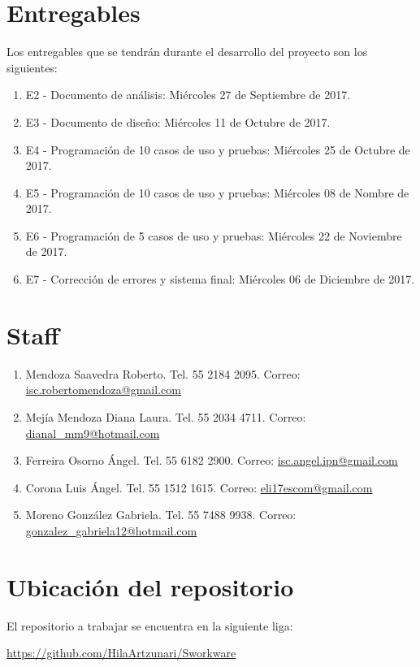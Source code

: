 \section{Entregables}

Los entregables que se tendrán durante el desarrollo del proyecto son los siguientes:

\begin{enumerate}
	\item E2 - Documento de análisis: Miércoles 27 de Septiembre de 2017.
	\item E3 - Documento de diseño: Miércoles 11 de Octubre de 2017.
	\item E4 - Programación de 10 casos de uso y pruebas: Miércoles 25 de Octubre de 2017.
	\item E5 - Programación de 10 casos de uso y pruebas: Miércoles 08 de Nombre de 2017.
	\item E6 - Programación de 5 casos de uso y pruebas: Miércoles 22 de Noviembre de 2017.
	\item E7 - Corrección de errores y sistema final: Miércoles 06 de Diciembre de 2017.
\end{enumerate}

\section{Staff}

\begin{enumerate}
	\item Mendoza Saavedra Roberto. Tel. 55 2184 2095. Correo: \href{isc.robertomendoza@gmail.com}{isc.robertomendoza@gmail.com}
	\item Mejía Mendoza Diana Laura. Tel. 55 2034 4711. Correo: \href{dianal_mm9@hotmail.com}{dianal\_mm9@hotmail.com}
	\item Ferreira Osorno Ángel. Tel. 55 6182 2900. Correo: \href{isc.angel.ipn@gmail.com}{isc.angel.ipn@gmail.com}
	\item Corona Luis Ángel. Tel. 55 1512 1615. Correo: \href{eli17escom@gmail.com}{eli17escom@gmail.com}
	\item Moreno González Gabriela. Tel. 55 7488 9938. Correo: \href{gonzalez_gabriela12@hotmail.com}{gonzalez\_gabriela12@hotmail.com}
\end{enumerate}

\section{Ubicación del repositorio}
El repositorio a trabajar se encuentra en la siguiente liga:

\href{https://github.com/HilaArtzunari/Sworkware}{https://github.com/HilaArtzunari/Sworkware}